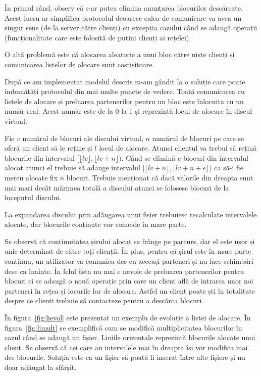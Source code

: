 \documentclass[a4wide,12pt]{report}
\newcommand{\floor}[1]{\lfloor{}#1\rfloor} %
\begin{document}
În primul rând, observ că s-ar putea elimina anunțarea blocurilor descărcate. Acest lucru ar simplifica protocolul
deoarece calea de comunicare va avea un singur sens (de la server către clienți) cu excepția cazului când se adaugă
operații (funcționalitate care este folosită de puțini clienți ai rețelei).

O altă problemă este că alocarea aleatorie a unui bloc către niște clienți și comunicarea listelor de alocare sunt
costisitoare.

După ce am implementat modelul descris m-am gândit la o soluție care poate îmbunătăți protocolul din mai multe puncte de
vedere. Toată comunicarea cu listele de alocare și preluarea partenerilor pentru un bloc este înlocuita cu un număr
real. Acest număr este de la 0 la 1 și reprezintă locul de alocare în discul virtual.

Fie $v$ numărul de blocuri ale discului virtual, $n$ numărul de blocuri pe care se oferă un client să le reține și $l$
locul de alocare. Atunci clientul va trebui să rețină blocurile din intervalul $[\floor{lv}, \floor{lv+n})$. Când se
elimină $e$ blocuri din intervalul alocat atunci el trebuie să adauge intervalul $[\floor{lv+n}, \floor{lv+n+e})$ ca
să-i fie mereu alocate fix $n$ blocuri. Trebuie menționat că dacă valorile din dreapta sunt mai mari decât mărimea
totală a discului atunci se folosesc blocuri de la începutul discului.

La expandarea discului prin adăugarea unui fișier trebuiesc recalculate intervalele alocate, dar blocurile conținute vor
coincide în mare parte.

Se observă că continuitatea șirului alocat se frânge pe parcurs, dar el este ușor și unic determinat de către toți
clienții. În plus, pentru că șirul este în mare parte continuu, un utilizator va comunica des cu aceeași parteneri și nu
face schimbări dese ca înainte. În felul ăsta nu mai e nevoie de preluarea partenerilor pentru blocuri ci se adaugă o
nouă operație prin care un client află de intrarea unor noi parteneri în rețea și locurile lor de alocare. Astfel un
client poate ști în totalitate despre ce clienți trebuie să contacteze pentru a descărca blocuri.

În figura~\ref{fig:lievol} este prezentat un exemplu de evoluție a listei de alocare. În figura~\ref{fig:limult} se
exemplifică cum se modifică multiplicitatea blocurilor în cazul când se adaugă un fișier. Liniile orizontale reprezintă
blocurile alocate unui client. Se observă că cei care au intervalele mai în dreapta își vor modifica mai des blocurile.
Soluția este ca un fișier să poată fi inserat între alte fișiere și nu doar adăugat la sfârșit.
\end{document}
